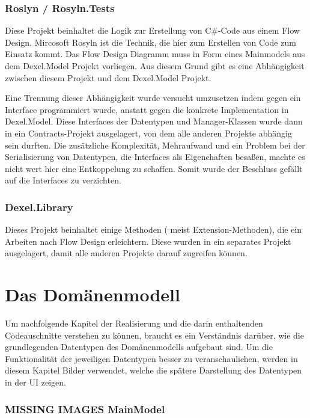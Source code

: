 \subsubsection{Roslyn / Rosyln.Tests}

Diese Projekt beinhaltet die Logik zur Erstellung von C\#-Code aus einem Flow
Design. Mircosoft Rosyln ist die Technik, die hier zum Erstellen von Code zum
Einsatz kommt.
Das Flow Design Diagramm muss in Form eines Mainmodels aus dem
Dexel.Model Projekt vorliegen. Aus diesem Grund gibt es eine Abhängigkeit
zwischen diesem Projekt und dem Dexel.Model Projekt. 

Eine Trennung dieser Abhängigkeit wurde versucht umzusetzen indem gegen ein Interface
programmiert wurde, anstatt gegen die konkrete Implementation in
Dexel.Model. Diese Interfaces der Datentypen und Manager-Klassen wurde dann
in ein Contracts-Projekt ausgelagert, von dem alle anderen Projekte abhängig
sein durften. Die zusätzliche Komplexität, Mehraufwand und ein Problem bei
der Serialisierung von Datentypen, die Interfaces als Eigenchaften besaßen,
machte es nicht wert hier eine Entkoppelung zu schaffen. Somit wurde der
Beschluss gefällt auf die Interfaces zu verzichten.

\subsubsection{Dexel.Library}

Dieses Projekt beinhaltet einige Methoden ( meist Extension-Methoden), die ein Arbeiten
nach Flow Design erleichtern. Diese wurden in ein separates Projekt
ausgelagert, damit alle anderen Projekte darauf zugreifen können.

\section{Das Domänenmodell}

Um nachfolgende Kapitel der Realisierung und die darin enthaltenden
Codeauschnitte verstehen zu können, braucht es ein Verständnis darüber, wie die
grundlegenden Datentypen des Domänenmodells aufgebaut sind. Um die Funktionalität der
jeweiligen Datentypen besser zu veranschaulichen, werden in diesem Kapitel
Bilder verwendet, welche die spätere Darstellung des Datentypen in der UI zeigen.

\subsubsection{{\bfseries\sffamily MISSING IMAGES} MainModel}

